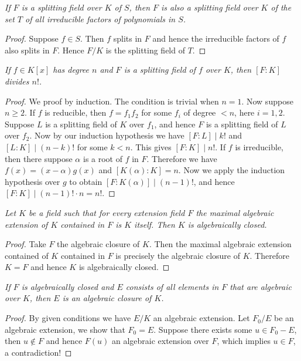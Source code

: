 \begin{problem}\em
If $F$ is a splitting field over $K$ of $S$,
then $F$ is also a splitting field over $K$ of the set $T$ of all irreducible factors of polynomials in $S$.
\end{problem}
\begin{proof}
Suppose $f\in S$. Then $f$ splits in $F$ and hence the irreducible factors of $f$ also splits in $F$. Hence $F/K$ is the splitting field of $T$.
\end{proof}
\begin{problem}\em
If $f\in K[x]$ has degree $n$ and $F$ is a splitting field of $f$ over $K$,
then $[F:K]$ divides $n!$.
\end{problem}
\begin{proof}
We proof by induction. The condition is trivial when $n=1$. Now suppose $n\ge 2$. If $f$ is reducible, then $f=f_1f_2$ for some $f_i$ of degree $<n$, here $i=1,2$. Suppose $L$ is a splitting field of $K$ over $f_1$, and hence $F$ is a splitting field of $L$ over $f_2$. Now by our induction hypothesis we have $[F:L]\mid k!$ and $[L:K]\mid (n-k)!$ for some $k<n$. This gives $[F:K]\mid n!$. If $f$ is irreducible, then there suppose $\alpha$ is a root of $f$ in $F$. Therefore we have $f(x)=(x-\alpha)g(x)$ and $[K(\alpha):K]=n$. Now we apply the induction hypothesis over $g$ to obtain $[F:K(\alpha)]\mid (n-1)!$, and hence $[F:K]\mid (n-1)!\cdot n=n!$.
\end{proof}
\begin{problem}\em
Let $K$ be a field such that for every extension field $F$ the maximal algebraic extension of $K$ contained in $F$ is $K$ itself. Then $K$ is algebraically closed.
\end{problem}
\begin{proof}
Take $F$ the algebraic closure of $K$. Then the maximal algebraic extension contained of $K$ contained in $F$ is precisely the algebraic closure of $K$. Therefore $K=F$ and hence $K$ is algebraically closed.
\end{proof}
\begin{problem}\em
If $F$ is algebraically closed and $E$ consists of all elements in $F$ that are algebraic over $K$, then $E$ is an algebraic closure of $K$.
\end{problem}
\begin{proof}
By given conditions we have $E/K$ an algebraic extension. Let $F_0/E$ be an algebraic extension, we show that $F_0=E$. Suppose there exists some $u\in F_0-E$, then $u\notin F$ and hence $F(u)$ an algebraic extension over $F$, which implies $u\in F$, a contradiction!
\end{proof}
